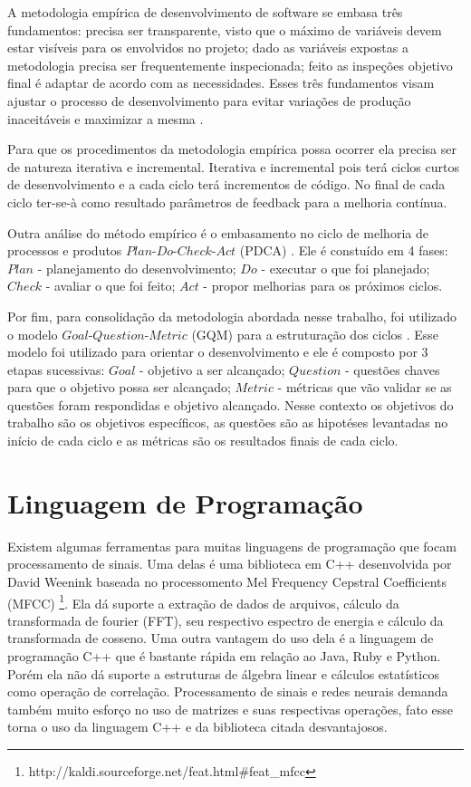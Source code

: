 A metodologia empírica de desenvolvimento de software se embasa três fundamentos: precisa ser transparente, visto que o máximo de variáveis devem estar visíveis para os envolvidos no projeto; dado as variáveis expostas a metodologia precisa ser frequentemente inspecionada; feito as inspeções objetivo final é adaptar de acordo com as necessidades. Esses três fundamentos visam ajustar o processo de desenvolvimento para evitar variações de produção inaceitáveis e maximizar a mesma \cite{empirical}.

Para que os procedimentos da metodologia empírica possa ocorrer ela precisa ser de natureza iterativa e incremental. Iterativa e incremental pois terá ciclos curtos de desenvolvimento e a cada ciclo terá incrementos de código. No final de cada ciclo ter-se-à como resultado parâmetros de feedback para a melhoria contínua. 

Outra análise do método empírico é o embasamento no ciclo de melhoria de processos e produtos $Plan$-$Do$-$Check$-$Act$ (PDCA) \cite{pdca}. Ele é constuído em 4 fases: $Plan$ - planejamento do desenvolvimento; $Do$ - executar o que foi planejado; $Check$ - avaliar o que foi feito; $Act$ - propor melhorias para os próximos ciclos.

Por fim, para consolidação da metodologia abordada nesse trabalho, foi utilizado o modelo $Goal$-$Question$-$Metric$ (GQM) para a estruturação dos ciclos \cite{gqm}. Esse modelo foi utilizado para orientar o desenvolvimento e ele é composto por 3 etapas sucessivas: $Goal$ - objetivo a ser alcançado; $Question$ - questões chaves para que o objetivo possa ser alcançado; $Metric$ - métricas que vão validar se as questões foram respondidas e objetivo alcançado. Nesse contexto os objetivos do trabalho são os objetivos específicos, as questões são as hipotéses levantadas no início de cada ciclo e as métricas são os resultados finais de cada ciclo.

\section{Linguagem de Programação}
\label{sec:linguagemprogramacao}

Existem algumas ferramentas para muitas linguagens de programação que focam processamento de sinais. Uma delas é uma biblioteca em C++ desenvolvida por David Weenink baseada no processomento Mel Frequency Cepstral Coefficients (MFCC) \footnote{http://kaldi.sourceforge.net/feat.html\#feat\_mfcc}. Ela dá suporte a extração de dados de arquivos, cálculo da transformada de fourier (FFT), seu respectivo espectro de energia e cálculo da transformada de cosseno. Uma outra vantagem do uso dela é a linguagem de programação C++ que é bastante rápida em relação ao Java, Ruby e Python. Porém ela não dá suporte a estruturas de álgebra linear e cálculos estatísticos como operação de correlação. Processamento de sinais e redes neurais demanda também muito esforço no uso de matrizes e suas respectivas operações, fato esse torna o uso da linguagem C++ e da biblioteca citada desvantajosos.

